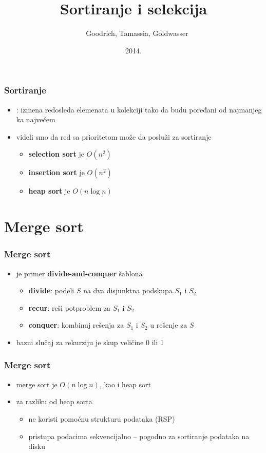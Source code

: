 \documentclass[compress]{beamer}
\title{Sortiranje i selekcija}
\author{\textcopyright \ \ Goodrich, Tamassia, Goldwasser}
\institute{Katedra za informatiku, Fakultet tehničkih nauka, Univerzitet u
Novom Sadu}
\date{2014.}
\begin{document}
\frame{\titlepage}

\begin{frame}[fragile]
  \frametitle{Sortiranje}
  \begin{itemize}
    \item {}: izmena redosleda elemenata u kolekciji tako da budu poređani od najmanjeg ka najvećem 
    \item videli smo da red sa prioritetom može da posluži za sortiranje
    \begin{itemize}
      \item \textbf{selection sort} je $O(n^2)$
      \item \textbf{insertion sort} je $O(n^2)$ 
      \item \textbf{heap sort} je $O(n\log n)$
    \end{itemize}
  \end{itemize}
\end{frame}

\section[Merge sort]{Merge sort}

\begin{frame}[fragile]
  \frametitle{Merge sort}
  \begin{itemize}
    \item {} je primer \textbf{divide-and-conquer} šablona 
    \begin{itemize}
      \item \textbf{divide}: podeli $S$ na dva disjunktna podskupa $S_1$ i $S_2$
      \item \textbf{recur}: reši potproblem za $S_1$ i $S_2$ 
      \item \textbf{conquer}: kombinuj rešenja za $S_1$ i $S_2$ u rešenje za $S$
    \end{itemize}
    \item bazni slučaj za rekurziju je skup veličine 0 ili 1 
  \end{itemize}
\end{frame}

\begin{frame}[fragile]
  \frametitle{Merge sort}
  \begin{itemize}
    \item merge sort je $O(n\log n)$, kao i heap sort
    \item za razliku od heap sorta 
    \begin{itemize}
      \item ne koristi pomoćnu strukturu podataka (RSP)
      \item pristupa podacima sekvencijalno -- pogodno za sortiranje podataka na disku
    \end{itemize}
  \end{itemize}
\end{frame}
\end{document}
